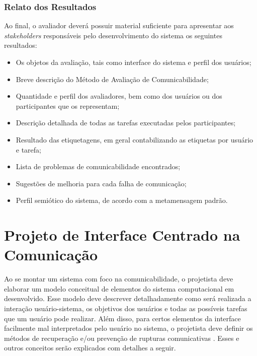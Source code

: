 \subsubsection{Relato dos Resultados}

\indent Ao final, o avaliador deverá possuir material suficiente para apresentar aos \textit{stakeholders} responsáveis pelo desenvolvimento do sistema os seguintes resultados:

\begin{itemize}
\item Os objetos da avaliação, tais como interface do sistema e perfil dos usuários;
\item Breve descrição do Método de Avaliação de Comunicabilidade;
\item Quantidade e perfil dos avaliadores, bem como dos usuários ou dos participantes que os representam;
\item Descrição detalhada de todas as tarefas executadas pelos participantes;
\item Resultado das etiquetagens, em geral contabilizando as etiquetas por usuário e tarefa;
\item Lista de problemas de comunicabilidade encontrados;
\item Sugestões de melhoria para cada falha de comunicação;
\item Perfil semiótico do sistema, de acordo com a metamensagem padrão.
\end{itemize}










\section{Projeto de Interface Centrado na Comunicação}

\indent Ao se montar um sistema com foco na comunicabilidade, o projetista deve elaborar um modelo conceitual de elementos do sistema computacional em desenvolvido. Esse modelo deve descrever detalhadamente como será realizada a interação usuário-sistema, os objetivos dos usuários e todas as possíveis tarefas que um usuário pode realizar. Além disso, para certos elementos da interface facilmente mal interpretados pelo usuário no sistema, o projetista deve definir os métodos de recuperação e/ou prevenção de rupturas comunicativas \cite{IHCbook}. Esses e outros conceitos serão explicados com detalhes a seguir.

